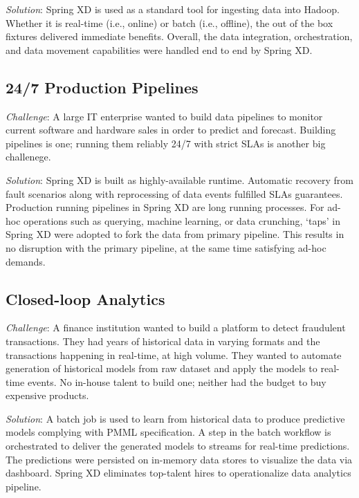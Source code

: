 \textit{Solution}: Spring XD is used as a standard tool for ingesting data 
into Hadoop. Whether it is real-time (i.e., online) or batch (i.e., offline),
the out of the box fixtures delivered immediate benefits. Overall, the data
integration, orchestration, and data movement capabilities were handled end
to end by Spring XD.

\subsection{24/7 Production Pipelines}
\textit{Challenge}: A large IT enterprise wanted to build data pipelines to
monitor current software and hardware sales in order to predict and forecast.
Building pipelines is one; running them reliably 24/7 with strict SLAs is
another big challenege.

\textit{Solution}: Spring XD is built as highly-available runtime. Automatic
recovery from fault scenarios along with reprocessing of data events fulfilled
SLAs guarantees. Production running pipelines in Spring XD are long running
processes. For ad-hoc operations such as querying, machine learning, or
data crunching, `taps' in Spring XD were adopted to fork the data from primary
pipeline. This results in no disruption with the primary pipeline, at the
same time satisfying ad-hoc demands.

\subsection{Closed-loop Analytics}
\textit{Challenge}: A finance institution wanted to build a platform to detect
fraudulent transactions. They had years of historical data in varying formats
and the transactions happening in real-time, at high volume. They wanted to
automate generation of historical models from raw dataset and apply the models
to real-time events. No in-house talent to build one; neither had the budget to buy expensive products.

\textit{Solution}: A batch job is used to learn from historical data to
produce predictive models complying with PMML specification. A step
in the batch workflow is orchestrated to deliver the generated models to
streams for real-time predictions. The predictions were persisted
on in-memory data stores to visualize the data via dashboard. Spring XD eliminates top-talent hires to operationalize data analytics pipeline.
